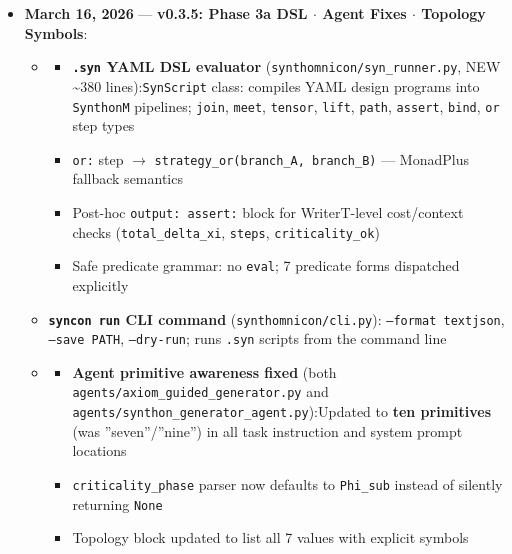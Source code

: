 \documentclass[12pt,a4paper]{article}
\begin{document}
\begin{itemize}
    \item 
    \textbf{March 16, 2026} --- \textbf{v0.3.5: Phase 3a DSL $\cdot$ Agent Fixes $\cdot$ Topology Symbols}:

    \begin{itemize}
    \item 
    \begin{itemize}
    \item \textbf{\texttt{.syn} YAML DSL evaluator} (\texttt{synthomnicon/syn\_runner.py}, NEW \textasciitilde{}380 lines):\texttt{SynScript} class: compiles YAML design programs into \texttt{SynthonM} pipelines; \texttt{join}, \texttt{meet}, \texttt{tensor}, \texttt{lift}, \texttt{path}, \texttt{assert}, \texttt{bind}, \texttt{or} step types
    \item \texttt{or:} step $\rightarrow$ \texttt{strategy\_or(branch\_A, branch\_B)} --- MonadPlus fallback semantics
    \item Post-hoc \texttt{output: assert:} block for WriterT-level cost/context checks (\texttt{total\_delta\_xi}, \texttt{steps}, \texttt{criticality\_ok})
    \item Safe predicate grammar: no \texttt{eval}; 7 predicate forms dispatched explicitly
\end{itemize}

    \item \textbf{\texttt{syncon run} CLI command} (\texttt{synthomnicon/cli.py}): \texttt{--format text\textbar{}json}, \texttt{--save PATH}, \texttt{--dry-run}; runs \texttt{.syn} scripts from the command line
    \item 
    \begin{itemize}
    \item \textbf{Agent primitive awareness fixed} (both \texttt{agents/axiom\_guided\_generator.py} and \texttt{agents/synthon\_generator\_agent.py}):Updated to \textbf{ten primitives} (was ''seven''/''nine'') in all task instruction and system prompt locations
    \item \texttt{criticality\_phase} parser now defaults to \texttt{Phi\_sub} instead of silently returning \texttt{None}
    \item Topology block updated to list all 7 values with explicit symbols
\end{itemize}


\end{itemize}
\end{itemize}
\end{document}
